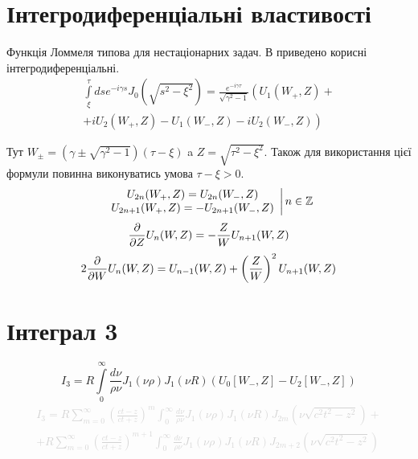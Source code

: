 \section{Інтегродиференціальні властивості}

Функція Ломмеля типова для нестаціонарних задач. В \cite[ст. 41]{Borisov1991} 
приведено корисні інтегродиференціальні.
%
\begin{equation} \begin{aligned}
\int \limits_{\xi}^{\tau} ds e^{-i \gamma s} J_0(\sqrt{s^2 - \xi^2 }) = 
\frac{e^{-i \gamma \tau}}{\sqrt{\gamma^2 - 1}} \left( U_1(W_+,Z) + \right. \\ 
\left. + i U_2(W_+,Z) - U_1(W_-,Z) - i U_2(W_-,Z) \right)
\end{aligned} \end{equation}

Тут $ W_\pm = (\gamma \pm \sqrt{\gamma^2 - 1}) (\tau - \xi) $ a 
$ Z = \sqrt{\tau^2 - \xi^2} $. Також для використання цієї формули повинна
виконуватись умова $ \tau - \xi > 0 $.
%
\textcolor{red}{ \begin{equation}
\left. \begin{array}{c}
U_{2n} (W_+, Z) = U_{2n} (W_-, Z) \\
U_{2n+1} (W_+, Z) = - U_{2n+1} (W_-, Z)
\end{array} \right| n \in \mathbb{Z}
\end{equation} }
%
\begin{equation} 
\frac{\partial }{\partial Z} U_n (W,Z) = - \frac{Z}{W} U_{n+1} (W,Z)
\end{equation}
%
\begin{equation}
2 \frac{\partial }{\partial W} U_n (W,Z) = U_{n-1} (W,Z) + 
\left( \frac{Z}{W} \right)^2 U_{n+1} (W,Z)
\end{equation}

\section{Інтеграл 3}

\begin{equation}
I_3 = R \int \limits_{0}^{\infty} \frac{d \nu}{\rho \nu} 
J_1(\nu \rho) J_1(\nu R) (U_0[ W_-, Z ] - U_2[ W_-, Z ])
\end{equation}
%
\textcolor{lightgray}{ \begin{equation*} \begin{aligned}
I_3 = R \sum \limits_{m = 0}^{\infty} \left( \frac{ct-z}{ct+z} \right)^m 
\int_{0}^{\infty} \frac{d \nu}{ \rho \nu} J_1(\nu \rho) J_1(\nu R) 
J_{2m} \left (\nu \sqrt{c^2t^2-z^2} \right) + \\ 
+ R \sum \limits_{m = 0}^{\infty} 
\left( \frac{ct-z}{ct+z} \right)^{m+1} \int_{0}^{\infty}
\frac{d \nu}{\rho \nu} J_1(\nu \rho) J_1(\nu R) 
J_{2m+2} \left (\nu \sqrt{c^2t^2-z^2} \right)
\end{aligned} \end{equation*} }

